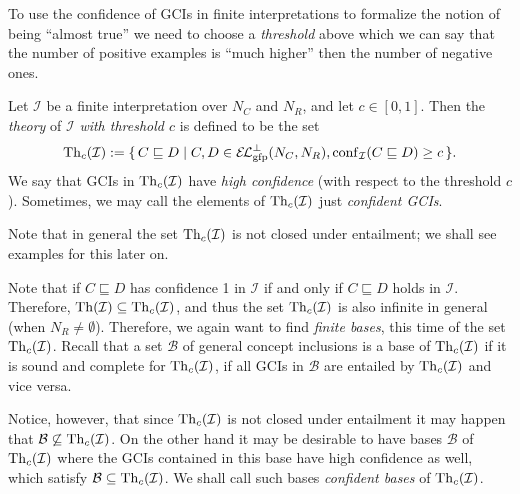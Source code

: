 To use the confidence of GCIs in finite interpretations to formalize the notion of being
``almost true'' we need to choose a \emph{threshold} above which we can say that the
number of positive examples is ``much higher'' then the number of negative ones.

\begin{Definition}
  \label{def:confident-theory-of-interpretations}
  Let $\mathcal{I}$ be a finite interpretation over $N_C$ and $N_R$, and let $c \in [0,
  1]$.  Then the \emph{theory} of $\mathcal{I}$ \emph{with threshold $c$} is defined to be
  the set
  \begin{equation*}
    \operatorname{Th}_c(\mathcal{I}) := {\{\, C \sqsubseteq D \mid C, D \in {\ensuremath{{\mathcal{E}\kern-.3ex\mathcal{L}}_\text{gfp}^\bot}}(N_C, N_R),
      \operatorname{conf}_{\mathcal{I}}( C \sqsubseteq D ) \ge c \,\}}.
  \end{equation*}
  We say that GCIs in $\operatorname{Th}_c(\mathcal{I})$ have \emph{high confidence} (with respect to
  the threshold $c$).  Sometimes, we may call the elements of $\operatorname{Th}_c(\mathcal{I})$ just
  \emph{confident GCIs}.
\end{Definition}

Note that in general the set $\operatorname{Th}_c(\mathcal{I})$ is not closed under entailment; we shall
see examples for this later on.

Note that if $C \sqsubseteq D$ has confidence 1 in $\mathcal{I}$ if and only if $C
\sqsubseteq D$ holds in $\mathcal{I}$.  Therefore, $\operatorname{Th}(\mathcal{I}) \subseteq
\operatorname{Th}_c(\mathcal{I})$, and thus the set $\operatorname{Th}_c(\mathcal{I})$ is also infinite in general
(\ie when $N_R \neq \emptyset$).  Therefore, we again want to find \emph{finite bases},
this time of the set $\operatorname{Th}_c(\mathcal{I})$.  Recall that a set $\mathcal{B}$ of general
concept inclusions is a base of $\operatorname{Th}_c(\mathcal{I})$ if it is sound and complete for
$\operatorname{Th}_c(\mathcal{I})$, \ie if all GCIs in $\mathcal{B}$ are entailed by
$\operatorname{Th}_c(\mathcal{I})$ and vice versa.

Notice, however, that since $\operatorname{Th}_c(\mathcal{I})$ is not closed under entailment it may
happen that $\mathcal{B} \not\subseteq \operatorname{Th}_c(\mathcal{I})$.  On the other hand it may be
desirable to have bases $\mathcal{B}$ of $\operatorname{Th}_c(\mathcal{I})$ where the GCIs contained in
this base have high confidence as well, \ie which satisfy $\mathcal{B} \subseteq
\operatorname{Th}_c(\mathcal{I})$.  We shall call such bases \emph{confident bases} of
$\operatorname{Th}_c(\mathcal{I})$.

